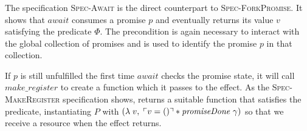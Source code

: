 
\subsubsection{}
\label{sec:sched-spec-await}

The specification \textsc{Spec-Await} is the direct counterpart to \textsc{Spec-ForkPromise}.
It shows that \(await\) consumes a promise \(p\) and eventually returns its value \(v\) satisfying the predicate \(\Phi\).
The precondition \gsPInv{} is again necessary to interact with the global collection of promises and \gsIsPr{} is used to identify the promise \(p\) in that collection.

If \(p\) is still unfulfilled the first time \(await\) checks the promise state, it will call \(make\_register\) to create a  function which it passes to the \esuspend{} effect.
As the \textsc{Spec-MakeRegister} specification shows,  returns a suitable function that satisfies the \gsIsReg{} predicate, instantiating \(P\) with \((\lambda\; v,\; \ulcorner v = () \urcorner \ast \emph{promiseDone}~\gamma{})\) so that we receive a \gspdone{} resource when the effect returns.


